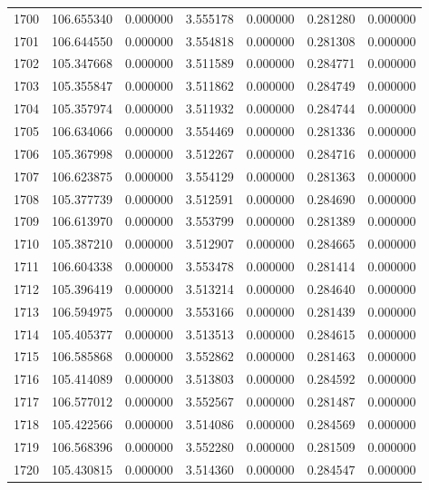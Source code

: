 \begin{tabular}{rrrrrrr}
1700 & 106.655340 &    0.000000 &  3.555178 &    0.000000 &    0.281280 &  0.000000 \\
1701 & 106.644550 &    0.000000 &  3.554818 &    0.000000 &    0.281308 &  0.000000 \\
1702 & 105.347668 &    0.000000 &  3.511589 &    0.000000 &    0.284771 &  0.000000 \\
1703 & 105.355847 &    0.000000 &  3.511862 &    0.000000 &    0.284749 &  0.000000 \\
1704 & 105.357974 &    0.000000 &  3.511932 &    0.000000 &    0.284744 &  0.000000 \\
1705 & 106.634066 &    0.000000 &  3.554469 &    0.000000 &    0.281336 &  0.000000 \\
1706 & 105.367998 &    0.000000 &  3.512267 &    0.000000 &    0.284716 &  0.000000 \\
1707 & 106.623875 &    0.000000 &  3.554129 &    0.000000 &    0.281363 &  0.000000 \\
1708 & 105.377739 &    0.000000 &  3.512591 &    0.000000 &    0.284690 &  0.000000 \\
1709 & 106.613970 &    0.000000 &  3.553799 &    0.000000 &    0.281389 &  0.000000 \\
1710 & 105.387210 &    0.000000 &  3.512907 &    0.000000 &    0.284665 &  0.000000 \\
1711 & 106.604338 &    0.000000 &  3.553478 &    0.000000 &    0.281414 &  0.000000 \\
1712 & 105.396419 &    0.000000 &  3.513214 &    0.000000 &    0.284640 &  0.000000 \\
1713 & 106.594975 &    0.000000 &  3.553166 &    0.000000 &    0.281439 &  0.000000 \\
1714 & 105.405377 &    0.000000 &  3.513513 &    0.000000 &    0.284615 &  0.000000 \\
1715 & 106.585868 &    0.000000 &  3.552862 &    0.000000 &    0.281463 &  0.000000 \\
1716 & 105.414089 &    0.000000 &  3.513803 &    0.000000 &    0.284592 &  0.000000 \\
1717 & 106.577012 &    0.000000 &  3.552567 &    0.000000 &    0.281487 &  0.000000 \\
1718 & 105.422566 &    0.000000 &  3.514086 &    0.000000 &    0.284569 &  0.000000 \\
1719 & 106.568396 &    0.000000 &  3.552280 &    0.000000 &    0.281509 &  0.000000 \\
1720 & 105.430815 &    0.000000 &  3.514360 &    0.000000 &    0.284547 &  0.000000 \\

\end{tabular}

